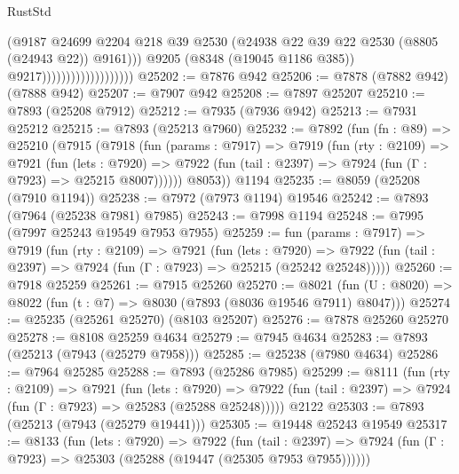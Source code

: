\begin{lexlean}{RustStd}
\begin{coremodule}
                                            (@9187
                                              @24699
                                              @2204
                                              @218
                                              @39
                                              @2530
                                              (@24938
                                                @22
                                                @39
                                                @22
                                                @2530
                                                (@8805 (@24943 @22))
                                                @9161)))
                                          @9205
                                          (@8348 (@19045 @1186 @385))
                                          @9217)))))))))))))))))))
@25202 := @7876 @942
@25206 := @7878 (@7882 @942) (@7888 @942)
@25207 := @7907 @942
@25208 := @7897 @25207
@25210 := @7893 (@25208 @7912)
@25212 := @7935 (@7936 @942)
@25213 := @7931 @25212
@25215 := @7893 (@25213 @7960)
@25232 := @7892
    (fun (fn : @89) =>
    @25210
      (@7915
        (@7918
          (fun (params : @7917) =>
          @7919
            (fun (rty : @2109) =>
            @7921
              (fun (lets : @7920) =>
              @7922 (fun (tail : @2397) => @7924 (fun (Γ : @7923) => @25215 @8007))))))
        @8053))
    @1194
@25235 := @8059 (@25208 (@7910 @1194))
@25238 := @7972 (@7973 @1194) @19546
@25242 := @7893 (@7964 (@25238 @7981) @7985)
@25243 := @7998 @1194
@25248 := @7995 (@7997 @25243 @19549 @7953 @7955)
@25259 := fun (params : @7917) =>
  @7919
    (fun (rty : @2109) =>
    @7921
      (fun (lets : @7920) =>
      @7922 (fun (tail : @2397) => @7924 (fun (Γ : @7923) => @25215 (@25242 @25248)))))
@25260 := @7918 @25259
@25261 := @7915 @25260
@25270 := @8021
    (fun (U : @8020) => @8022 (fun (t : @7) => @8030 (@7893 (@8036 @19546 @7911) @8047)))
@25274 := @25235 (@25261 @25270) (@8103 @25207)
@25276 := @7878 @25260 @25270
@25278 := @8108 @25259 @4634
@25279 := @7945 @4634
@25283 := @7893 (@25213 (@7943 (@25279 @7958)))
@25285 := @25238 (@7980 @4634)
@25286 := @7964 @25285
@25288 := @7893 (@25286 @7985)
@25299 := @8111
    (fun (rty : @2109) =>
    @7921
      (fun (lets : @7920) =>
      @7922 (fun (tail : @2397) => @7924 (fun (Γ : @7923) => @25283 (@25288 @25248)))))
    @2122
@25303 := @7893 (@25213 (@7943 (@25279 @19441)))
@25305 := @19448 @25243 @19549
@25317 := @8133
    (fun (lets : @7920) =>
    @7922
      (fun (tail : @2397) =>
      @7924 (fun (Γ : @7923) => @25303 (@25288 (@19447 (@25305 @7953 @7955))))))

\end{coremodule}
\end{lexlean}
